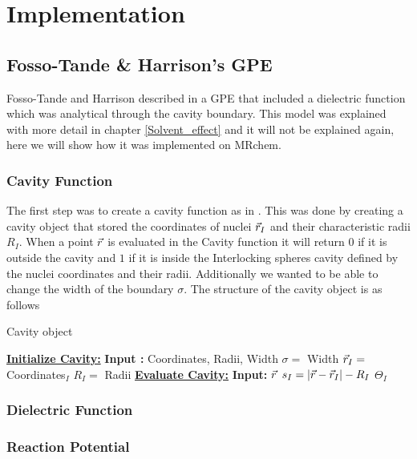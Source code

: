 \documentclass[../master_thesis.tex]{subfiles}
\begin{document}
\chapter{Implementation}\label{chap:implementation}
\section{Fosso-Tande \& Harrison's \ac{GPE}}
Fosso-Tande and Harrison described in \cite{FossoTande:2013ka} a \ac{GPE} that
included a dielectric function which was analytical through the cavity boundary.
This model was explained with more detail in chapter \ref{Solvent_effect} and
it will not be explained again, here we will show how it was implemented on
MRchem.
\subsection{Cavity Function}
The first step was to create a cavity function as in \cite{FossoTande:2013ka}.
This was done by creating a cavity object that stored the coordinates of nuclei
$\vec{r}_I$ and their characteristic radii $R_I$. When a point $\vec{r}$ is evaluated
in the Cavity function it will return $0$ if it is outside the cavity and $1$ if
it is inside the Interlocking spheres cavity defined by the nuclei coordinates
and their radii. Additionally we wanted to be able to change the width of the
boundary $\sigma$. The structure of the cavity object is as follows

\begin{algorithm}
  \caption{Cavity object}
  \begin{algorithmic}
    \STATE \underline{\textbf{Initialize Cavity:}}
    \STATE \textbf{Input :} Coordinates, Radii, Width
    \STATE $\sigma = $ Width
     \STATE $\vec{r}_I = $ Coordinates$_I$
     \STATE $R_I = $ Radii
    \ENDFOR
    \STATE
    \STATE \underline{\textbf{Evaluate Cavity:}}
    \STATE \textbf{Input: } $\vec{r}$
      \STATE $s_I = \abs{\vec{r} - \vec{r}_I} - R_I$
      \STATE $\Theta_I$
    \ENDFOR
  \end{algorithmic}
\end{algorithm}


\subsection{Dielectric Function}
\subsection{Reaction Potential}
\end{document}

